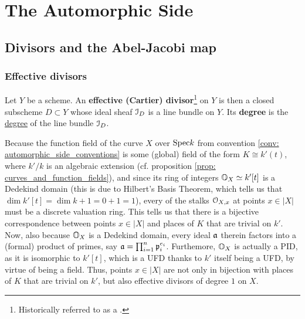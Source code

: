 \section{The Automorphic Side}
    \subsection{Divisors and the Abel-Jacobi map}
        \subsubsection{Effective divisors}
            \begin{definition}[Divisors] \label{def: divisors}
                Let $Y$ be a scheme. An \textbf{effective (Cartier) divisor}\footnote{Historically referred to as a .} on $Y$ is then a closed subscheme $D \subset Y$ whose ideal sheaf $\mathcal{I}_D$ is a line bundle on $Y$. Its \textbf{degree} is the \href{https://stacks.math.columbia.edu/tag/0AYQ}{\underline{degree}} of the line bundle $\mathcal{I}_D$.  
            \end{definition}
            \begin{remark} 
                Because the function field of the curve $X$ over $\mathrm{Spec} k$ from convention \ref{conv: automorphic_side_conventions} is some (global) field of the form $K \cong k'(t)$, where $k'/k$ is an algebraic extension (cf. proposition \ref{prop: curves_and_function_fields}), and since its ring of integers $\mathbb{O}_X \simeq k'[t]$ is a Dedekind domain (this is due to Hilbert's Basis Theorem, which tells us that $\dim k'[t] = \dim k + 1 = 0 + 1 = 1$), every of the stalks $\mathcal{O}_{X, x}$ at points $x \in |X|$ must be a discrete valuation ring. This tells us that there is a bijective correspondence between points $x \in |X|$ and places of $K$ that are trivial on $k'$. Now, also because $\mathbb{O}_X$ is a Dedekind domain, every ideal $\mathfrak{a}$ therein factors into a (formal) product of primes, say $\mathfrak{a} = \prod_{i = 1}^n \mathfrak{p}_i^{e_i}$. Furthemore, $\mathbb{O}_X$ is actually a PID, as it is isomorphic to $k'[t]$, which is a UFD thanks to $k'$ itself being a UFD, by virtue of being a field. Thus, points $x \in |X|$ are not only in bijection with places of $K$ that are trivial on $k'$, but also effective divisors of degree $1$ on $X$.
            \end{remark}
            
